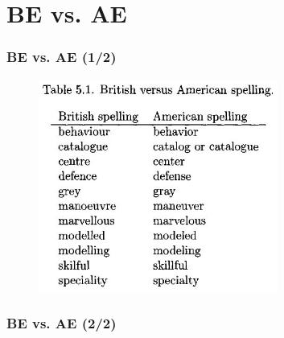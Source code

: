 \documentclass{beamer}
\begin{document}
\section{BE vs. AE}
\begin{frame}
\frametitle{BE vs. AE (1/2)}
\begin{figure}[t]
 \includegraphics[width=0.7\textwidth]{images/be1.jpeg}
\end{figure}
\end{frame}
\begin{frame}
\frametitle{BE vs. AE (2/2)}
\end{frame}
\end{document}
